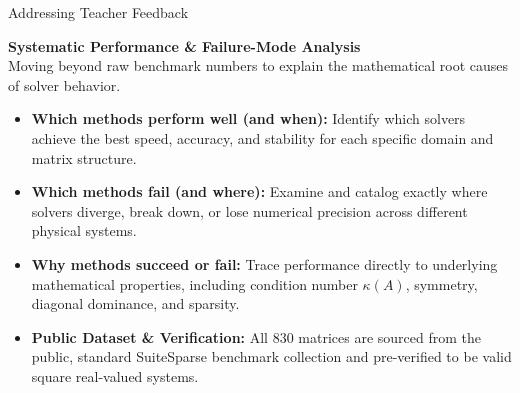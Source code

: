 \documentclass[aspectratio=169,10pt]{beamer}
\begin{document}
\begin{frame}{Addressing Teacher Feedback}
  \vspace{-0.15em}
  \colorbox{LSlightgold}{\parbox{0.98\linewidth}{\vspace{0.25em}
    {\bfseries\normalsize\color{LSnavy} Systematic Performance \& Failure-Mode Analysis}\\[0.15em]
    {\footnotesize\color{LSgray} Moving beyond raw benchmark numbers to explain the mathematical root causes of solver behavior.}
    \vspace{0.25em}}}
  \vspace{0.5em}

  \small
  \begin{itemize}\setlength\itemsep{0.6em}
    \item \textbf{\color{LSteal}Which methods perform well (and when):}
      Identify which solvers achieve the best speed, accuracy, and stability for each specific domain and matrix structure.

    \item \textbf{\color{LSteal}Which methods fail (and where):}
      Examine and catalog exactly where solvers diverge, break down, or lose numerical precision across different physical systems.

    \item \textbf{\color{LSteal}Why methods succeed or fail:}
      Trace performance directly to underlying mathematical properties, including condition number $\kappa(A)$, symmetry, diagonal dominance, and sparsity.

    \item \textbf{\color{LSteal}Public Dataset \& Verification:}
      All 830 matrices are sourced from the public, standard SuiteSparse benchmark collection and pre-verified to be valid square real-valued systems.
  \end{itemize}
\end{frame}

\end{document}
